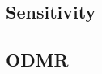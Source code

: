 \subsection{Sensitivity}
\cite{RevModPhys.92.015004}

\cite{PhysRevApplied.4.014009}


\cite{PhysRevApplied.15.064022}

\cite{PhysRevResearch.2.023394}


\cite{Castelletto2019}

\cite{Zhou2023}

\subsection{ODMR}
\cite{PhysRevB.101.064102}


